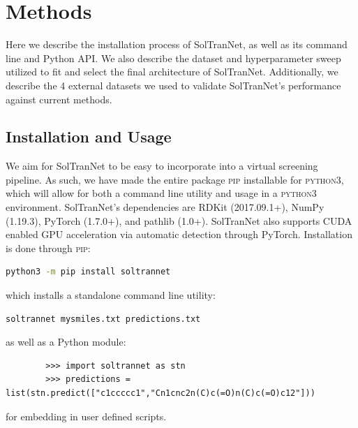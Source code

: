 \documentclass[journal=jcim,manuscript=applicationnotes]{achemso} %
\begin{document}
\section{Methods}

Here we describe the installation process of SolTranNet, as well as its command line and Python API.
We also describe the dataset and hyperparameter sweep utilized to fit and select the final architecture of SolTranNet.
Additionally, we describe the 4 external datasets we used to validate SolTranNet's performance against current methods.

\subsection{Installation and Usage}
We aim for SolTranNet to be easy to incorporate into a virtual screening pipeline.
As such, we have made the entire package \textsc{\textsc{pip}} installable for \textsc{python3}, which will allow for both a command line utility and usage in a \textsc{python3} environment. 
SolTranNet's dependencies are RDKit\cite{rdkit} (2017.09.1+),  NumPy\cite{numpy} (1.19.3), PyTorch\cite{pytorch} (1.7.0+), and pathlib (1.0+).
SolTranNet also supports CUDA enabled GPU acceleration via automatic detection through PyTorch.  Installation is done through \textsc{pip}: \\
        \begin{lstlisting}[frame=none,language=bash]
 python3 -m pip install soltrannet
        \end{lstlisting}
which installs a standalone command line utility:
        \begin{lstlisting}[frame=none,language=bash]
soltrannet mysmiles.txt predictions.txt
        \end{lstlisting}
as well as a Python module:
        \begin{verbatim}
        >>> import soltrannet as stn
        >>> predictions = list(stn.predict(["c1ccccc1","Cn1cnc2n(C)c(=O)n(C)c(=O)c12"]))
        \end{verbatim}
 for embedding in user defined scripts.
\end{document}
